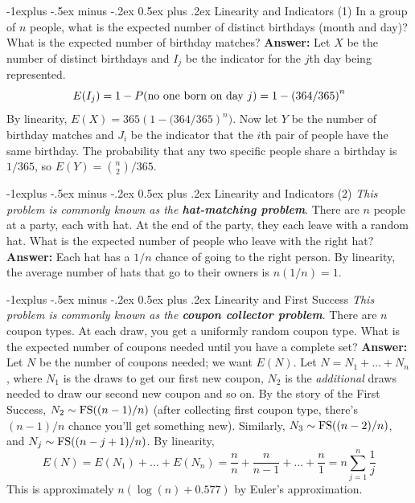 \documentclass[10pt,landscape]{article}
\makeatletter
\renewcommand{\subsection}{\@startsection{subsection}{2}{0mm}%
                                {-1explus -.5ex minus -.2ex}%
                                {0.5ex plus .2ex}%
                                {\normalfont\normalsize\bfseries}}
\makeatother
\begin{document}
\begin{multicols*}{3}
	\subsection{Linearity and Indicators (1)} In a group of $n$ people, what is the expected number of distinct birthdays (month and day)? What is the expected number of birthday matches? \textbf{Answer:} Let $X$ be the number of distinct birthdays and $I_j$ be the indicator for the $j$th day being represented. \[E(I_j) = 1-P(\textnormal{no one born on day }j) = 1 - \left(364/365\right)^n\] By linearity, $\boxed{E(X) = 365\left(1-(364/365\right)^n)}$. 
	Now let $Y$ be the number of birthday matches and $J_i$ be the indicator that the $i$th pair of people have the same birthday. The probability that any two specific people share a birthday is $1/365$, so $\boxed{E(Y) = \binom{n}{2} / 365}$. 
									
	\subsection{Linearity and Indicators (2)}
	\emph{This problem is commonly known as the \textbf{hat-matching problem}}. There are $n$ people at a party, each with hat. At the end of the party, they each leave with a random hat. What is the expected number of people who leave with the right hat? \textbf{Answer:} Each hat has a $1/n$ chance of going to the right person. By linearity, the average number of hats that go to their owners is $\boxed{n(1/n) = 1}$.
									
	\subsection{Linearity and First Success}
	\emph{This problem is commonly known as the \textbf{coupon collector problem}}.
	There are $n$ coupon types. At each draw, you get a uniformly random coupon type. What is the expected number of coupons needed until you have a complete set? \textbf{Answer:} Let $N$ be the number of coupons needed; we want $E(N)$. Let $N = N_1 + \dots + N_n$, where $N_1$ is the draws to get our first new coupon, $N_2$ is the \emph{additional} draws needed to draw our second new coupon and so on. By the story of the First Success, $N_2 \sim \textnormal{FS}((n-1)/n)$ (after collecting first coupon type, there's $(n-1)/n$ chance you'll get something new). Similarly, $N_3 \sim \textnormal{FS}((n-2)/n)$, and $N_j \sim \textnormal{FS}((n-j+1)/n)$. By linearity,
	\[E(N) = E(N_1) + \dots + E(N_n) = \frac{n}{n} + \frac{n}{n-1} + \dots + \frac{n}{1} = \boxed{n\sum^n_{j=1} \frac{1}{j}}\]
	This is approximately $n (\log(n) + 0.577)$ by Euler's approximation.
									

\end{multicols*}
\end{document}
